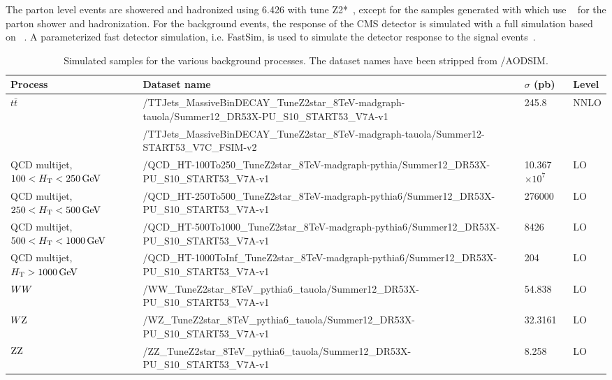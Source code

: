 The parton level events are showered and hadronized using {\PYTHIA}6.426 with tune
Z2*~\cite{Chatrchyan:2013gfi}, except for the samples generated with \AMCATNLO which use 
\HERWIG~\cite{Corcella:2000bw,Corcella:2002jc} for the parton shower and hadronization.  
For the background events, the response of the CMS detector is
simulated with a full simulation based on \GEANTfour~\cite{G4}.  A parameterized fast detector
simulation, i.e. FastSim, is used to simulate the detector response to the signal
events~\cite{fastsim}. 


\begin{table}
\fontsize{8 pt}{1 em}
\selectfont
\caption{Simulated samples for the various background processes. The dataset names have been stripped 
from /AODSIM.}
\begin{center}
\begin{tabular}{l l l l}
\toprule
Process & Dataset name & $\sigma$ (pb) & Level \\
\midrule
\multirow{2}{*}{$t\bar{t}$} &
/TTJets\_MassiveBinDECAY\_TuneZ2star\_8TeV-madgraph-tauola/Summer12\_DR53X-PU\_S10\_START53\_V7A-v1 
& 245.8 & NNLO \\
& /TTJets\_MassiveBinDECAY\_TuneZ2star\_8TeV-madgraph-tauola/Summer12-START53\_V7C\_FSIM-v2 & & \\
\midrule
QCD multijet, $100 < H_{\mathrm{T}}< 250\,\text{Ge\hspace{-.08em}V}$ & 
/QCD\_HT-100To250\_TuneZ2star\_8TeV-madgraph-pythia/Summer12\_DR53X-PU\_S10\_START53\_V7A-v1
& 10.367$\times 10^{7}$ & LO \\
QCD multijet, $250 < H_{\mathrm{T}}< 500\,\text{Ge\hspace{-.08em}V}$ &  
/QCD\_HT-250To500\_TuneZ2star\_8TeV-madgraph-pythia6/Summer12\_DR53X-PU\_S10\_START53\_V7A-v1
& 276000 & LO \\
QCD multijet, $500 < H_{\mathrm{T}}< 1000\,\text{Ge\hspace{-.08em}V}$ & 
/QCD\_HT-500To1000\_TuneZ2star\_8TeV-madgraph-pythia6/Summer12\_DR53X-PU\_S10\_START53\_V7A-v1 
& 8426 & LO \\
QCD multijet, $H_{\mathrm{T}} > 1000\,\text{Ge\hspace{-.08em}V}$ & 
/QCD\_HT-1000ToInf\_TuneZ2star\_8TeV-madgraph-pythia6/Summer12\_DR53X-PU\_S10\_START53\_V7A-v1 
& 204 & LO \\
\midrule
$WW$ & /WW\_TuneZ2star\_8TeV\_pythia6\_tauola/Summer12\_DR53X-PU\_S10\_START53\_V7A-v1 &
54.838 & LO \\
$W\mathrm{Z}$ & /WZ\_TuneZ2star\_8TeV\_pythia6\_tauola/Summer12\_DR53X-PU\_S10\_START53\_V7A-v1 
& 32.3161 & LO \\
$\mathrm{Z}\mathrm{Z}$ & /ZZ\_TuneZ2star\_8TeV\_pythia6\_tauola/Summer12\_DR53X-PU\_S10\_START53\_V7A-v1
& 8.258 & LO \\

\end{tabular}
\end{center}
\end{table}
